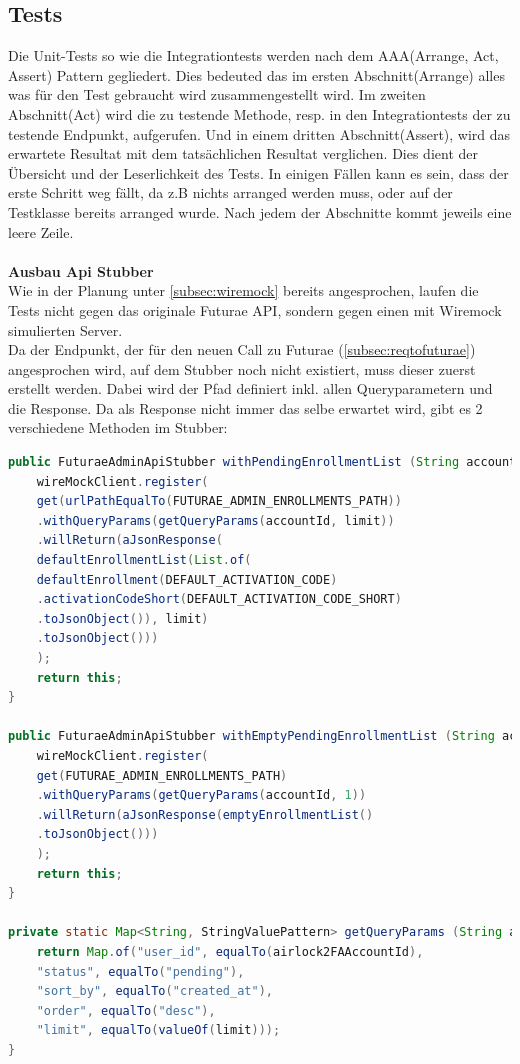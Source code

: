 \subsection{Tests}
Die Unit-Tests so wie die Integrationtests werden nach dem AAA(Arrange, Act, Assert) Pattern gegliedert. Dies bedeuted das im ersten Abschnitt(Arrange) alles was für den Test gebraucht wird zusammengestellt wird. Im zweiten Abschnitt(Act) wird die zu testende Methode, resp. in den Integrationtests der zu testende Endpunkt, aufgerufen. Und in einem dritten Abschnitt(Assert), wird das erwartete Resultat mit dem tatsächlichen Resultat verglichen. Dies dient der Übersicht und der Leserlichkeit des Tests. In einigen Fällen kann es sein, dass der erste Schritt weg fällt, da z.B nichts arranged werden muss, oder auf der Testklasse bereits arranged wurde. Nach jedem der Abschnitte kommt jeweils eine leere Zeile. \\
\\
\textbf{Ausbau Api Stubber}\\
Wie in der Planung unter \ref{subsec:wiremock} bereits angesprochen, laufen die Tests nicht gegen das originale Futurae API, sondern gegen einen mit Wiremock simulierten Server.\\
Da der Endpunkt, der für den neuen Call zu Futurae (\ref{subsec:reqtofuturae}) angesprochen wird, auf dem Stubber noch nicht existiert, muss dieser zuerst erstellt werden. Dabei wird der Pfad definiert inkl. allen Queryparametern und die Response. Da als Response nicht immer das selbe erwartet wird, gibt es 2 verschiedene Methoden im Stubber:
\begin{lstlisting}[language=Java]
	public FuturaeAdminApiStubber withPendingEnrollmentList (String accountId, int limit) {
	wireMockClient.register(
	get(urlPathEqualTo(FUTURAE_ADMIN_ENROLLMENTS_PATH))
	.withQueryParams(getQueryParams(accountId, limit))
	.willReturn(aJsonResponse(
	defaultEnrollmentList(List.of(
	defaultEnrollment(DEFAULT_ACTIVATION_CODE)
	.activationCodeShort(DEFAULT_ACTIVATION_CODE_SHORT)
	.toJsonObject()), limit)
	.toJsonObject()))
	);
	return this;
}

public FuturaeAdminApiStubber withEmptyPendingEnrollmentList (String accountId) {
	wireMockClient.register(
	get(FUTURAE_ADMIN_ENROLLMENTS_PATH)
	.withQueryParams(getQueryParams(accountId, 1))
	.willReturn(aJsonResponse(emptyEnrollmentList()
	.toJsonObject()))
	);
	return this;
}

private static Map<String, StringValuePattern> getQueryParams (String airlock2FAAccountId, int limit) {
	return Map.of("user_id", equalTo(airlock2FAAccountId),
	"status", equalTo("pending"),
	"sort_by", equalTo("created_at"),
	"order", equalTo("desc"),
	"limit", equalTo(valueOf(limit)));
}
\end{lstlisting}
